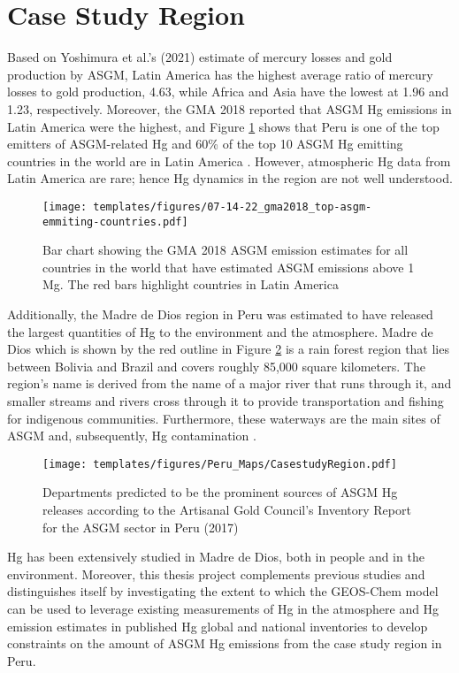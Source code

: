 \section{Case Study Region}
\begin{flushleft}
Based on Yoshimura et al.'s (2021) estimate of mercury losses and gold production by ASGM, Latin America has the highest average ratio of mercury losses to gold production, 4.63, while Africa and Asia have the lowest at 1.96 and 1.23, respectively. Moreover, the GMA 2018 reported that ASGM Hg emissions in Latin America were the highest, and Figure \ref{fig:global_asgm_emissions_above_a_tone_barchart} shows that Peru is one of the top emitters of ASGM-related Hg and 60\% of the top 10 ASGM Hg emitting countries in the world are in Latin America  \cite{united_nations_environment_programme_technical_2019}. However, atmospheric Hg data from Latin America are rare; hence Hg dynamics in the region are not well understood. 
\end{flushleft}
\begin{figure}[H]
  \texttt{[image: templates/figures/07-14-22\_gma2018\_top-asgm-emmiting-countries.pdf]}
  \centering
  \caption{Bar chart showing the GMA 2018 ASGM \hg emission estimates for all countries in the world that have estimated ASGM \hg emissions above 1 Mg. The red bars highlight countries in Latin America \cite{united_nations_environment_programme_technical_2019}}
  \label{fig:global_asgm_emissions_above_a_tone_barchart}
\end{figure}
\FloatBarrier
\begin{flushleft}
Additionally, the Madre de Dios region in Peru was estimated to have released the largest quantities of Hg to the environment and the atmosphere\cite{agc_reporte_2017}. Madre de Dios which is shown by the red outline in Figure \ref{fig:PeruCS} is a rain forest region that lies between Bolivia and Brazil and covers roughly 85,000 square kilometers. The region's name is derived from the name of a major river that runs through it, and smaller streams and rivers cross through it to provide transportation and fishing for indigenous communities. Furthermore, these waterways are the main sites of ASGM and, subsequently, Hg contamination \cite{ashe_elevated_2012,agc_reporte_2017}. 
\begin{figure}[H]
  \texttt{[image: templates/figures/Peru\_Maps/CasestudyRegion.pdf]}
  \centering
  \caption{Departments predicted to be the prominent sources of ASGM Hg releases according to the Artisanal Gold Council's  Inventory Report for the ASGM sector in Peru (2017) }
  \label{fig:PeruCS}
\end{figure}
\FloatBarrier

Hg has been extensively studied in Madre de Dios, both in people and in the environment. Moreover, this thesis project complements previous studies and distinguishes itself  by investigating the extent to which the GEOS-Chem model can be used to leverage existing measurements of Hg in the atmosphere and Hg emission estimates in published Hg global and national inventories to develop constraints on the amount of ASGM Hg emissions from the case study region in Peru. 

\end{flushleft}
